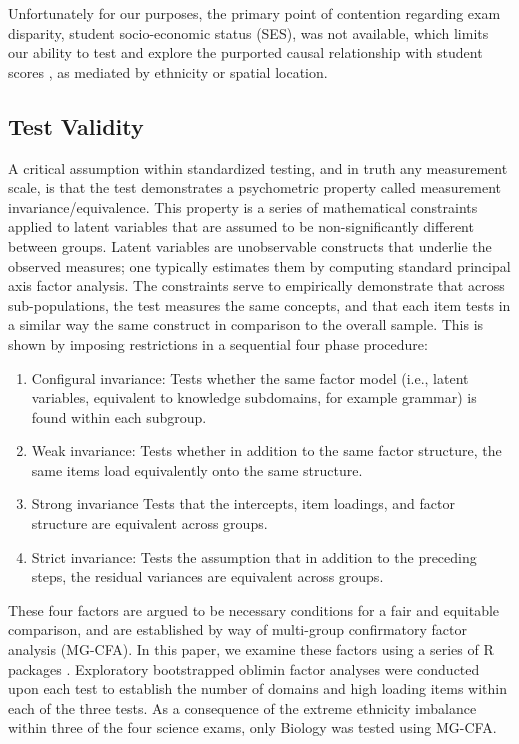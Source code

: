 \documentclass{article}\usepackage[]{graphicx}\usepackage[]{color}
\begin{document}
Unfortunately for our purposes, the primary point of contention regarding exam disparity, student socio-economic status (SES), was not available, which limits our ability to test and explore the purported causal relationship with student scores \cite{Gaudet}, as mediated by ethnicity or spatial location. 

\subsection{Test Validity}
A critical assumption within standardized testing, and in truth any measurement scale, is that the test demonstrates a psychometric property called measurement invariance/equivalence. This property is a series of mathematical constraints applied to latent variables that are assumed to be non-significantly different between groups. Latent variables are unobservable constructs that underlie the observed measures; one typically estimates them by computing standard principal axis factor analysis. The constraints serve to empirically demonstrate that across sub-populations, the test measures the same concepts, and that each item tests in a similar way the same construct in comparison to the overall sample. This is shown by imposing restrictions in a sequential four phase procedure:
\begin{enumerate}
\item{Configural invariance:} 
Tests whether the same factor model (i.e., latent variables, equivalent to knowledge subdomains, for example grammar) is found within each subgroup.
\item{Weak invariance:}
Tests whether in addition to the same factor structure, the same items load equivalently onto the same structure.
\item{Strong invariance}
Tests that the intercepts, item loadings, and factor structure are equivalent across groups.
\item{Strict invariance:}
Tests the assumption that in addition to the preceding steps, the residual variances are equivalent across groups.
\end{enumerate}
These four factors are argued to be necessary conditions for a fair and equitable comparison\cite{Meredith}, and are established by way of multi-group confirmatory factor analysis (MG-CFA). In this paper, we examine these factors using a series of R packages \cite{psych,lavaan,semTools}. 
Exploratory bootstrapped oblimin factor analyses were conducted upon each test to establish the number of domains and high loading items within each of the three tests. As a consequence of the extreme ethnicity imbalance within three of the four science exams, only Biology was tested using MG-CFA.
\end{document}
